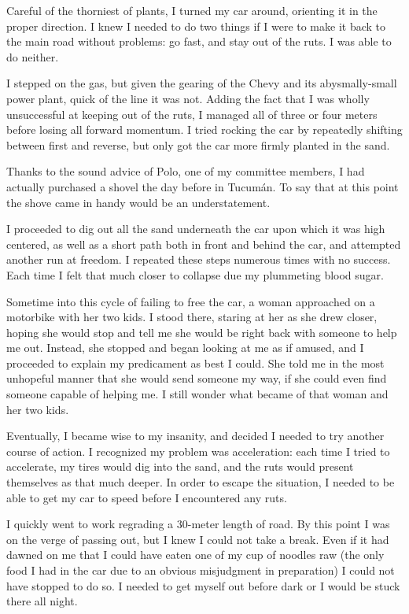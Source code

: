 Careful of the thorniest of plants, I turned my car around, orienting it in the proper direction. I knew I needed to do two things if I were to make it back to the main road without problems: go fast, and stay out of the ruts. I was able to do neither.

I stepped on the gas, but given the gearing of the Chevy and its abysmally-small power plant, quick of the line it was not. Adding the fact that I was wholly unsuccessful at keeping out of the ruts, I managed all of three or four meters before losing all forward momentum. I tried rocking the car by repeatedly shifting between first and reverse, but only got the car more firmly planted in the sand.

Thanks to the sound advice of Polo, one of my committee members, I had actually purchased a shovel the day before in Tucumán. To say that at this point the shove came in handy would be an understatement.

I proceeded to dig out all the sand underneath the car upon which it was high centered, as well as a short path both in front and behind the car, and attempted another run at freedom. I repeated these steps numerous times with no success. Each time I felt that much closer to collapse due my plummeting blood sugar.

Sometime into this cycle of failing to free the car, a woman approached on a motorbike with her two kids. I stood there, staring at her as she drew closer, hoping she would stop and tell me she would be right back with someone to help me out. Instead, she stopped and began looking at me as if amused, and I proceeded to explain my predicament as best I could. She told me in the most unhopeful manner that she would send someone my way, if she could even find someone capable of helping me. I still wonder what became of that woman and her two kids.

Eventually, I became wise to my insanity, and decided I needed to try another course of action. I recognized my problem was acceleration: each time I tried to accelerate, my tires would dig into the sand, and the ruts would present themselves as that much deeper. In order to escape the situation, I needed to be able to get my car to speed before I encountered any ruts.

I quickly went to work regrading a 30-meter length of road. By this point I was on the verge of passing out, but I knew I could not take a break. Even if it had dawned on me that I could have eaten one of my cup of noodles raw (the only food I had in the car due to an obvious misjudgment in preparation) I could not have stopped to do so. I needed to get myself out before dark or I would be stuck there all night.


